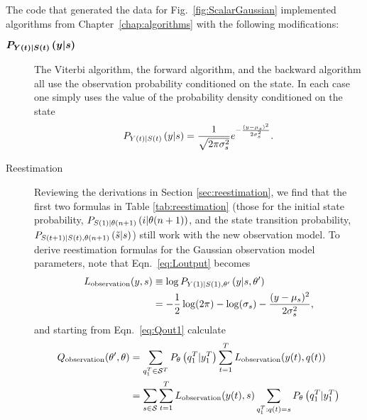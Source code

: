 The code that generated the data for Fig.~\ref{fig:ScalarGaussian}
implemented algorithms from Chapter~\ref{chap:algorithms} with the
following modifications:
\begin{description} 
\item[$\bm{P_{{Y}{(t)}|{S}{(t)}} \left(y|s \right)}$] The Viterbi
  algorithm, the forward algorithm, and the backward algorithm all use
  the observation probability conditioned on the state. In each case one
  simply uses the value of the probability density conditioned on the
  state
  \begin{equation*}
    P_{{Y}{(t)}|{S}{(t)}} \left(y|s \right) = \frac{1}{\sqrt{2\pi
    \sigma_s^2}} e^{-\frac{(y-\mu_s)^2}{2\sigma_s^2}}.
  \end{equation*}
\newpage%
\item[Reestimation] Reviewing the derivations in Section
  \ref{sec:reestimation}, we find that the first two formulas in Table
  \ref{tab:reestimation} (those for the initial state probability, %
  $P_{{S}{(1)}|{\theta}{(n+1)}} \left(i|{\theta}{(n+1)} \right)$, 
  and the state transition probability,
  $P_{{S}{(t+1)}|{S}{(t)},{\theta}{(n+1)}} \left({\tilde s}|s \right)$) 
  still work with the new observation model.  To derive reestimation
  formulas for the Gaussian observation model parameters, note that
  Eqn.~\eqref{eq:Loutput} becomes %
  \begin{align}
    L_{\text{observation}}(y,s) & \equiv \log
  P_{{Y}{(1)}|{S}{(1)},\theta'} \left(y|s,\theta' \right)\\
    \label{eq:LoutputG}
    &= -\frac{1}{2} \log (2\pi) - \log(\sigma_s) -
    \frac{(y-\mu_s)^2}{2\sigma_s^2},
  \end{align}
  and starting from Eqn.~\eqref{eq:Qout1} calculate
\begin{align}
  \label{eq:QoutG1}
  Q_{\text{observation}} (\parameters',\parameters) &=
  \sum_{\ts{q}{1}{T}\in\states^T} P_{\parameters}
  \left(\ts{q}{1}{T}|\ts{y}{1}{T} \right) \sum_{t=1}^T
  L_{\text{observation}}(\ti{y}{t},\ti{q}{t})\\
  \label{eq:QoutG2}
  &= \sum_{s\in\states} \sum_{t=1}^T L_{\text{observation}}(\ti{y}{t},s)
  \sum_{\ts{q}{1}{T}:\ti{q}{t}=s }P_{\parameters}
  \left(\ts{q}{1}{T}|\ts{y}{1}{T} \right) \\

\end{align}
\end{description}
